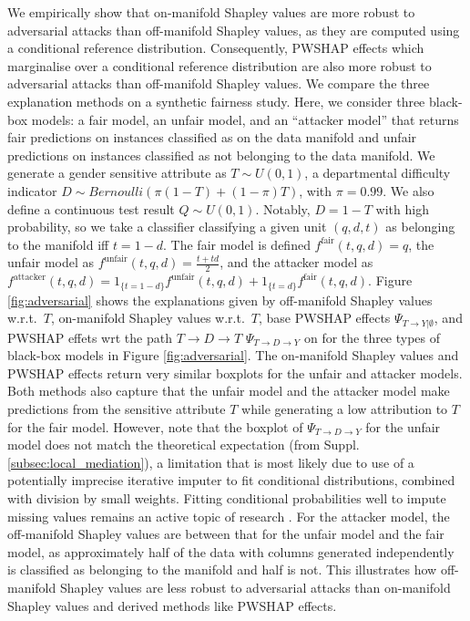 \documentclass{article}
\theoremstyle{plain}
\theoremstyle{definition}
\theoremstyle{remark}
\newcommand{\effect}{\Psi}
\theoremstyle{mystyle}
\begin{document}
We empirically show that on-manifold Shapley values are more robust to adversarial attacks than off-manifold Shapley values, as they are computed using a conditional reference distribution. Consequently, PWSHAP effects which marginalise over a conditional reference distribution are also more robust to adversarial attacks than off-manifold Shapley values. We compare the three explanation methods on a synthetic fairness study. Here, we consider three black-box models: a fair model, an unfair model, and an ``attacker model'' that returns fair predictions on instances classified as on the data manifold and unfair predictions on instances classified as not belonging to the data manifold. We generate a gender sensitive attribute as $T \sim \textit{U}(0,1)$, a departmental difficulty indicator $D \sim \textit{Bernoulli}(\pi (1-T) + (1-\pi)T )$, with $\pi = 0.99$. We also define a continuous test result $Q \sim \textit{U}(0,1)$. Notably, $D = 1-T$ with high probability, so we take a classifier classifying a given unit $(q,d,t)$ as belonging to the manifold iff $t = 1 - d$.  The fair model is defined $f^{\text{fair}}(t,q,d) = q$, the unfair model as $f^{\text{unfair}}(t,q,d) = \frac{t + td}{2}$, and the attacker model as $f^{\text{attacker}}(t,q,d) = 1_{\{t = 1 - d\}}f^{\text{unfair}}(t,q,d) + 1_{\{t = d\}}f^{\text{fair}}(t,q,d)$.
Figure \ref{fig:adversarial} shows the explanations given by off-manifold Shapley values w.r.t.~$T$, on-manifold Shapley values w.r.t.~$T$, base PWSHAP effects $\effect_{ T \rightarrow Y |{\emptyset}}$, and PWSHAP effets wrt the path $T \rightarrow D \rightarrow T$ $\effect_{ T \rightarrow D \rightarrow Y}$ on for the three types of black-box models in Figure \ref{fig:adversarial}. The on-manifold Shapley values and PWSHAP effects return very similar boxplots for the unfair and attacker models. Both methods also capture that the unfair model and the attacker model make predictions from the sensitive attribute $T$ while generating a low attribution to $T$ for the fair model. However, note that the boxplot of $\effect_{ T \rightarrow D \rightarrow Y}$ for the unfair model does not match the theoretical expectation (from Suppl. \ref{subsec:local_mediation}), a limitation that is most likely due to use of a potentially imprecise iterative imputer to fit conditional distributions, combined with division by small weights. Fitting conditional probabilities well to impute missing values remains an active topic of research .
For the attacker model, the off-manifold Shapley values are between that for the unfair model and the fair model, as approximately half of the data with columns generated independently is classified as belonging to the manifold and half is not. This illustrates how off-manifold Shapley values are less robust to adversarial attacks than on-manifold Shapley values and derived methods like PWSHAP effects.
\end{document}
